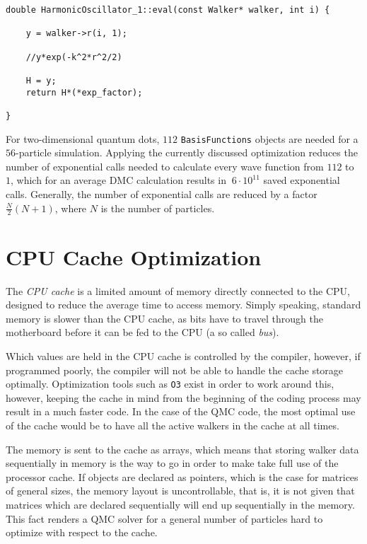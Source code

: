 \begin{lstlisting}[caption={The implementation of a single-particle wave function. The pointer to the previously calculated exponential factor is simply accessed in line 8.}]
double HarmonicOscillator_1::eval(const Walker* walker, int i) {

    y = walker->r(i, 1);
    
    //y*exp(-k^2*r^2/2)
    
    H = y;
    return H*(*exp_factor);
    
}
\end{lstlisting}

For two-dimensional quantum dots, $112$ \verb+BasisFunctions+ objects are needed for a $56$-particle simulation. Applying the currently discussed optimization reduces the number of exponential calls needed to calculate every wave function from $112$ to $1$, which for an average DMC calculation results in $~6\cdot 10^{11}$ saved exponential calls. Generally, the number of exponential calls are reduced by a factor $\frac{N}{2}(N + 1)$, where $N$ is the number of particles.


\section{CPU Cache Optimization}
\label{sec:CPUcache}

The \textit{CPU cache} is a limited amount of memory directly connected to the CPU, designed to reduce the average time to access memory. Simply speaking, standard memory is slower than the CPU cache, as bits have to travel through the motherboard before it can be fed to the CPU (a so called \textit{bus}). 

Which values are held in the CPU cache is controlled by the compiler, however, if programmed poorly, the compiler will not be able to handle the cache storage optimally. Optimization tools such as \verb+O3+ exist in order to work around this, however, keeping the cache in mind from the beginning of the coding process may result in a much faster code. In the case of the QMC code, the most optimal use of the cache would be to have all the active walkers in the cache at all times. 

The memory is sent to the cache as arrays, which means that storing walker data sequentially in memory is the way to go in order to make take full use of the processor cache. If objects are declared as pointers, which is the case for matrices of general sizes, the memory layout is uncontrollable, that is, it is not given that matrices which are declared sequentially will end up sequentially in the memory. This fact renders a QMC solver for a general number of particles hard to optimize with respect to the cache.







